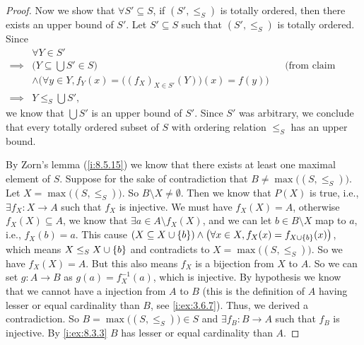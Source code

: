 \begin{proof}
  Now we show that \(\forall S' \subseteq S\), if \((S', \leq_S)\) is totally ordered, then there exists an upper bound of \(S'\).
  Let \(S' \subseteq S\) such that \((S', \leq_S)\) is totally ordered.
  Since
  \begin{align*}
             & \forall Y \in S'                                                                                                 \\
    \implies & \Big(Y \subseteq \bigcup S' \in S\Big)                                            &  & \text{(from claim above)} \\
             & \land \Big(\forall y \in Y, f_Y(x) = \big((f_X)_{X \in S'}(Y)\big)(x) = f(y)\Big)                                \\
    \implies & Y \leq_S \bigcup S',
  \end{align*}
  we know that \(\bigcup S'\) is an upper bound of \(S'\).
  Since \(S'\) was arbitrary, we conclude that every totally ordered subset of \(S\) with ordering relation \(\leq_S\) has an upper bound.

  By Zorn's lemma (\cref{i:8.5.15}) we know that there exists at least one maximal element of \(S\).
  Suppose for the sake of contradiction that \(B \neq \max\big((S, \leq_S)\big)\).
  Let \(X = \max\big((S, \leq_S)\big)\).
  So \(B \setminus X \neq \emptyset\).
  Then we know that \(P(X)\) is true, i.e., \(\exists f_X : X \to A\) such that \(f_X\) is injective.
  We must have \(f_X(X) = A\), otherwise \(f_X(X) \subseteq A\), we know that \(\exists a \in A \setminus f_X(X)\), and we can let \(b \in B \setminus X\) map to \(a\), i.e., \(f_X(b) = a\).
  This cause \((X \subseteq X \cup \left\lbrace b\right\rbrace) \land \big(\forall x \in X, f_X(x) = f_{X \cup \left\lbrace b\right\rbrace}(x)\big)\), which means \(X \leq_S X \cup \left\lbrace b\right\rbrace\) and contradicts to \(X = \max\big((S, \leq_S)\big)\).
  So we have \(f_X(X) = A\).
  But this also means \(f_X\) is a bijection from \(X\) to \(A\).
  So we can set \(g : A \to B\) as \(g(a) = f_X^{-1}(a)\), which is injective.
  By hypothesis we know that we cannot have a injection from \(A\) to \(B\) (this is the definition of \(A\) having lesser or equal cardinality than \(B\), see \cref{i:ex:3.6.7}).
  Thus, we derived a contradiction.
  So \(B = \max\big((S, \leq_S)\big) \in S\) and \(\exists f_B : B \to A\) such that \(f_B\) is injective.
  By \cref{i:ex:8.3.3} \(B\) has lesser or equal cardinality than \(A\).
\end{proof}


